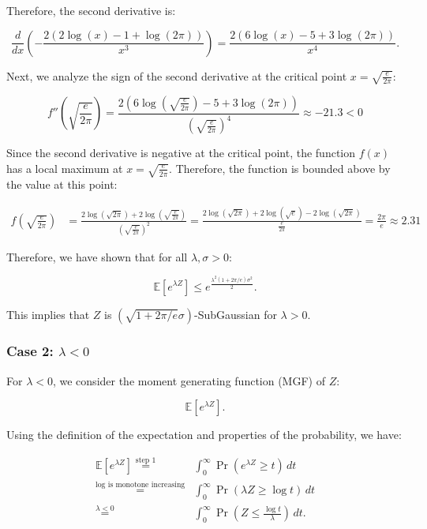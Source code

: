 \documentclass[a4 paper]{article}
\theoremstyle{boldStyle}
\theoremstyle{boldBlueStyle}
\theoremstyle{boldPurpleStyle}
\theoremstyle{boldRedStyle}
\begin{document}
Therefore, the second derivative is:

\[
\frac{d}{dx} \left( -\frac{2(2\log(x) - 1 + \log(2\pi))}{x^3} \right) = \frac{2(6\log(x) - 5 + 3\log(2\pi))}{x^4}.
\]

Next, we analyze the sign of the second derivative at the critical point \(x = \sqrt{\frac{e}{2\pi}}\):

\[
  f''\left(\sqrt{\frac{e}{2\pi}}\right) = \frac{2(6\log(\sqrt{\frac{e}{2\pi}}) - 5 + 3\log(2\pi))}{\left(\sqrt{\frac{e}{2\pi}}\right)^4} \approx -21.3 < 0
\]

Since the second derivative is negative at the critical point, the function \(f(x)\) has a local maximum at \(x = \sqrt{\frac{e}{2\pi}}\). 
Therefore, the function is bounded above by the value at this point:

\begin{align*}
  f\left(\sqrt{\frac{e}{2\pi}}\right) &= \frac{2\log(\sqrt{2\pi}) + 2\log\left(\sqrt{\frac{e}{2\pi}}\right)}{\left(\sqrt{\frac{e}{2\pi}}\right)^2} 
  = \frac{2\log(\sqrt{2\pi}) + 2\log\left(\sqrt{e}\right) - 2\log\left(\sqrt{2\pi}\right)}{\frac{e}{2\pi}} = \frac{2\pi}{e} \approx 2.31
\end{align*}

Therefore, we have shown that for all $\lambda, \sigma > 0$:

\[
\mathbb{E}[e^{\lambda Z}] \leq  e^{\frac{\lambda^2 (1 + 2\pi/e) \sigma^2}{2}}.
\]

This implies that \(Z\) is \((\sqrt{1 + 2\pi/e} \sigma)\)-SubGaussian for \(\lambda > 0\).

\subsubsection*{Case 2: \(\lambda < 0\)}

For \(\lambda < 0\), we consider the moment generating function (MGF) of \(Z\):

\[
\mathbb{E}[e^{\lambda Z}].
\]

Using the definition of the expectation and properties of the probability, we have:

\begin{align*}
\mathbb{E}[e^{\lambda Z}] \stackrel{\text{step 1}}{=} &\int_0^\infty \Pr(e^{\lambda Z} \geq t) \, dt \\
\stackrel{\text{log is monotone increasing}}{=} &\int_0^\infty \Pr(\lambda Z \geq \log t) \, dt \\
\stackrel{\lambda < 0}{=} &\int_0^\infty \Pr\left(Z \leq \frac{\log t}{\lambda}\right) \, dt.
\end{align*}
\end{document}
